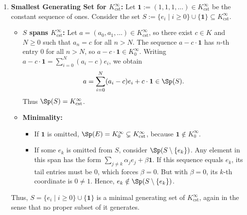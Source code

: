 \begin{exercisesolution}
\begin{enumerate}[label=\textbf{(\alph*)}]
    \item \textbf{Smallest Generating Set for $K_{\mathrm{cst}}^\infty$:}
    Let $\mathbf{1} := (1, 1, 1, \dots) \in K_{\mathrm{cst}}^\infty$ be the constant sequence of ones. Consider the set $S := \{e_i \mid i \ge 0\} \cup \{\mathbf{1}\} \subseteq K_{\mathrm{cst}}^\infty$.
    \begin{itemize}
        \item \textbf{$S$ spans $K_{\mathrm{cst}}^\infty$:} Let $a = (a_0, a_1, \dots) \in K_{\mathrm{cst}}^\infty$, so there exist $c \in K$ and $N \ge 0$ such that $a_n = c$ for all $n > N$. The sequence $a - c \cdot \mathbf{1}$ has $n$-th entry $0$ for all $n > N$, so $a - c \cdot \mathbf{1} \in K_0^\infty$. Writing $a - c \cdot \mathbf{1} = \sum_{i=0}^N (a_i - c) e_i$, we obtain
        \[
        a = \sum_{i=0}^N (a_i - c) e_i + c \cdot \mathbf{1} \in \Sp(S).
        \]
        Thus $\Sp(S) = K_{\mathrm{cst}}^\infty$.
        \item \textbf{Minimality:}
        \begin{itemize}
            \item If $\mathbf{1}$ is omitted, $\Sp(E) = K_0^\infty \subsetneq K_{\mathrm{cst}}^\infty$, because $\mathbf{1} \notin K_0^\infty$.
            \item If some $e_k$ is omitted from $S$, consider $\Sp(S \setminus \{e_k\})$. Any element in this span has the form $\sum_{j \ne k} \alpha_j e_j + \beta \mathbf{1}$. If this sequence equals $e_k$, its tail entries must be $0$, which forces $\beta = 0$. But with $\beta = 0$, its $k$-th coordinate is $0 \ne 1$. Hence, $e_k \notin \Sp(S \setminus \{e_k\})$.
        \end{itemize}
    \end{itemize}
    Thus, $S = \{e_i \mid i \ge 0\} \cup \{\mathbf{1}\}$ is a minimal generating set of $K_{\mathrm{cst}}^\infty$, again in the sense that no proper subset of it generates.
\end{enumerate}
\end{exercisesolution}
